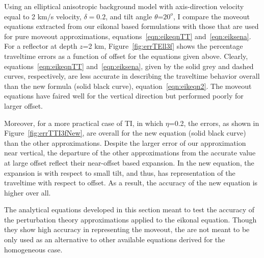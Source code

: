 Using an elliptical anisotropic background model with axis-direction
velocity equal to 2 km/s velocity, $\delta=0.2$, and tilt angle $\theta$=$20^{o}$, 
I compare  the moveout equations extracted from our eikonal based formulations with
those that are used for pure moveout approximations, equations~\ref{eqn:eikeqnTT} and~\ref{eqn:eiksena}. 
For a reflector at depth $z$=2 km, Figure~\ref{fig:errTEll3f} shows the percentage traveltime errors as a function of
offset for the equations given above. Clearly, equations~\ref{eqn:eikeqnTT} and~\ref{eqn:eiksena}, given by the solid grey and
dashed curves, respectively,
 are less accurate in describing the traveltime behavior overall than
the new formula (solid black curve),
equation~\ref{eqn:eikeqn2}. The moveout equations have faired well
for the vertical direction but performed poorly for larger offset.

Moreover, for a more practical case of TI, in which $\eta$=0.2, the errors, as shown in Figure~\ref{fig:errTTI3fNew}, 
are   overall for the new equation (solid black curve) than the other
approximations. Despite the larger error of our approximation near vertical, the departure
of the other approximations from the accurate value at large offset
reflect their near-offset based expansion. In the new equation, the
expansion is with respect to small tilt, and thus, has  representation of the traveltime with respect to
offset. As a result, the accuracy of the new equation is higher over all.

The analytical equations developed in this section  
 meant to test the accuracy of the perturbation theory approximations applied to the eikonal
equation. Though they show 
high accuracy in representing the moveout, the  are not meant to be
only used as  an alternative to other available equations derived for
the homogeneous case. 

